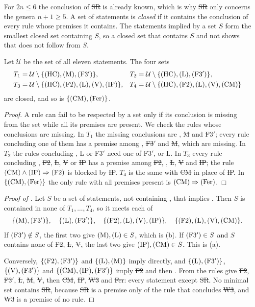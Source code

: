 For $2n\le6$ the conclusion of \st{SR} is already known, which is why
\st{SR} only concerns the genera $n+1\ge5$. A set of
statements is \emph{closed} if it contains the conclusion of every rule whose
premises it contains. The statements implied by a set $S$ form the smallest
closed set containing $S$, so a closed set that contains $S$ and not \HC{}
shows that \HC{} does not follow from $S$.

\begin{lemma}\label{lem:closedsets}
Let $\mathcal{U}$ be the set of all eleven statements. The four sets
\[
\begin{aligned}
  T_{1}&=\mathcal{U}\setminus\{\textup{(HC)},\textup{(M)},\textup{(F3$'$)}\},&
  T_{2}&=\mathcal{U}\setminus\{\textup{(HC)},\textup{(L)},\textup{(F3$'$)}\},\\
  T_{3}&=\mathcal{U}\setminus\{\textup{(HC)},\textup{(F2)},\textup{(L)},\textup{(V)},\textup{(IP)}\},&
  T_{4}&=\mathcal{U}\setminus\{\textup{(HC)},\textup{(F2)},\textup{(L)},\textup{(V)},\textup{(CM)}\}
\end{aligned}
\]
are closed, and so is $\{\textup{(CM)},\textup{(Fer)}\}$.
\end{lemma}

\begin{proof}
A rule can fail to be respected by a set only if its conclusion is missing
from the set while all its premises are present. We check the rules whose
conclusions are missing. In $T_{1}$ the missing conclusions are \HC, \st{M}
and \st{F3$'$}; every rule concluding one of them has a premise among \HC,
\st{F3$'$} and \st{M}, which are missing. In $T_{2}$ the rules concluding
\HC, \st{L} or \st{F3$'$} need one of \st{F3$'$}, \HC{} or \st{L}. In
$T_{3}$ every rule concluding \HC, \st{F2}, \st{L}, \st{V} or \st{IP} has a
premise among \st{F2}, \HC, \st{L}, \st{V} and \st{IP}; the rule
$\textup{(CM)}\wedge\textup{(IP)}\Rightarrow\textup{(F2)}$ is blocked by \st{IP}. $T_{4}$ is
the same with \st{CM} in place of \st{IP}. In $\{\textup{(CM)},\textup{(Fer)}\}$ the
only rule with all premises present is $\textup{(CM)}\Rightarrow\textup{(Fer)}$.
\end{proof}

\begin{proof}[Proof of ]
Let $S$ be a set of statements, not containing \HC, that implies \HC. Then
$S$ is contained in none of $T_{1},\dots,T_{4}$, so it meets each of
\[
  \{\textup{(M)},\textup{(F3$'$)}\},\quad\{\textup{(L)},\textup{(F3$'$)}\},\quad
  \{\textup{(F2)},\textup{(L)},\textup{(V)},\textup{(IP)}\},\quad\{\textup{(F2)},\textup{(L)},\textup{(V)},\textup{(CM)}\}.
\]
If $\textup{(F3$'$)}\notin S$, the first two give $\textup{(M)},\textup{(L)}\in S$, which is
(b). If $\textup{(F3$'$)}\in S$ and $S$ contains none of \st{F2}, \st{L}, \st{V},
the last two give $\textup{(IP)},\textup{(CM)}\in S$. This is (a).

Conversely, $\{\textup{(F2)},\textup{(F3$'$)}\}$ and $\{\textup{(L)},\textup{(M)}\}$ imply \HC{}
directly, and $\{\textup{(L)},\textup{(F3$'$)}\}$, $\{\textup{(V)},\textup{(F3$'$)}\}$ and
$\{\textup{(CM)},\textup{(IP)},\textup{(F3$'$)}\}$ imply \st{F2} and then \HC. From \HC{} the
rules give \st{F2}, \st{F3$'$}, \st{L}, \st{M}, \st{V}, then \st{CM},
\st{IP}, \st{W3} and \st{Fer}: every statement except \st{SR}. No minimal set
contains \st{SR}, because \st{SR} is a premise only of the rule that
concludes \st{W3}, and \st{W3} is a premise of no rule.
\end{proof}

